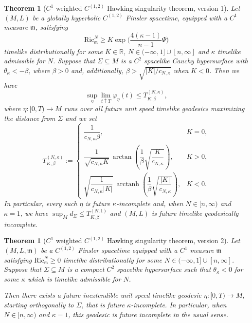 \documentclass[a4paper,11pt]{article}
\numberwithin{equation}{section}
\theoremstyle{definition}
\theoremstyle{plain}
\newtheorem{Theorem}[Definition]{Theorem}
\newcommand{\R}{\mathbb R}
\newcommand{\Ric}{\mathrm{Ric}}
\newcommand{\m}{\mathfrak m}
\begin{document}
\begin{Theorem}[$C^1$ weighted $C^{(1,2)}$ Hawking singularity theorem, version 1]
Let $(M,L)$ be a globally hyperbolic $C^{(1,2)}$ Finsler spacetime, equipped with a $C^1$ measure $\mathfrak m$, satisfying 
\[
\Ric^N_\m \geq K\exp\biggl( \frac{4(\kappa-1)}{n-1}\Psi \biggr)
\]
timelike distributionally for some $K\in\R$, $N \in (-\infty,1] \cup [n,\infty]$ and $\kappa$ timelike admissible for $N$.
Suppose that $\Sigma\subseteq M$ is a $C^2$ spacelike Cauchy hypersurface with $\theta_\kappa <-\beta$, where $\beta>0$ and, additionally, $\beta>\sqrt{|K|/c_{N,\kappa}}$ when $K<0$.
Then we have
\[
\sup_\eta \lim_{t \uparrow T} \varphi_\eta(t) \leq T^{(N,\kappa)}_{K,\beta},
\]
where $\eta:[0,T) \to M$ runs over all future unit speed timelike geodesics maximizing the distance from $\Sigma$ and we set 
\[
    T^{(N,\kappa)}_{K,\beta}
    :=
    \begin{cases}
        \dfrac{1}{c_{N,\kappa}\beta},
        & K=0,\\[1.2ex]
        \dfrac{1}{\sqrt{c_{N,\kappa}K}}\,
        \arctan\!\left(
            \dfrac{1}{\beta}\sqrt{\dfrac{K}{c_{N,\kappa}}}
        \right),
        & K>0,\\[1.6ex]
        \sqrt{\dfrac{1}{c_{N,\kappa}|K|}}\,
        \operatorname{arctanh}\!\left(
            \dfrac{1}{\beta}\sqrt{\dfrac{|K|}{c_{N,\kappa}}}
        \right),
        & K<0.
    \end{cases}
\]
In particular, every such $\eta$ is future $\kappa$-incomplete and, when $N \in [n,\infty)$ and $\kappa=1$, we have $\sup_M d_\Sigma \le T^{(N,1)}_{K,\beta}$ and $(M,L)$ is future timelike geodesically incomplete.
\end{Theorem}

\begin{Theorem}[$C^1$ weighted $C^{(1,2)}$ Hawking singularity theorem, version 2]
Let $(M,L,\mathfrak m)$ be a $C^{(1,2)}$ Finsler spacetime equipped with a $C^1$ measure $\mathfrak m$ satisfying $\Ric^N_{\mathfrak m}\geq0$ timelike distributionally for some $N\in(-\infty,1]\cup[n,\infty]$.
Suppose that $\Sigma\subseteq M$ is a compact $C^2$ spacelike hypersurface such that $\theta_\kappa<0$ for some $\kappa$ which is timelike admissible for $N$.

Then there exists a future inextendible unit speed timelike geodesic $\eta:[0,T)\to M$, starting orthogonally to $\Sigma$, that is future $\kappa$-incomplete.
In particular, when $N\in[n,\infty)$ and $\kappa=1$, this geodesic is future incomplete in the usual sense.
\end{Theorem}
\end{document}
